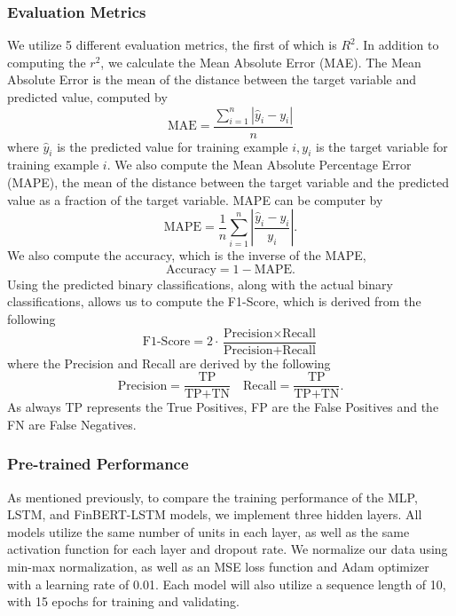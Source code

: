 \documentclass[12pt]{article}
\begin{document}
\subsubsection*{Evaluation Metrics}
We utilize 5 different evaluation metrics, the first of which is $R^2$. In addition to computing the $r^2$, we calculate the Mean Absolute Error (MAE). The Mean Absolute Error is the mean of the distance between the target variable and predicted value, computed by 
\begin{equation}
	\text{MAE}=\frac{\sum_{i=1}^{n}|\hat{y}_i-y_i|}{n}
\end{equation}
where $\hat{y}_i$ is the predicted value for training example $i,y_i$ is the target variable for training example $i$. We also compute the Mean Absolute Percentage Error (MAPE), the mean of the distance between the target variable and the predicted value as a fraction of the target variable. MAPE can be computer by
\begin{equation}
	\text{MAPE}=\frac{1}{n}\sum_{i=1}^{n}\left|\frac{\hat{y}_i-y_i}{y_i}\right|.
\end{equation}
We also compute the accuracy, which is the inverse of the MAPE,
\begin{equation}
	\text{Accuracy}=1-\text{MAPE}.
\end{equation}
Using the predicted binary classifications, along with the actual binary classifications, allows us to compute the F1-Score, which is derived from the following
\begin{equation}
	\text{F1-Score}=2\cdot\frac{\text{Precision}\times\text{Recall}}{\text{Precision}+\text{Recall}}
\end{equation}
where the Precision and Recall are derived by the following
\begin{equation}\label{eq:f1score}
	\text{Precision}=\frac{\text{TP}}{\text{TP}+\text{TN}}\quad\text{Recall}=\frac{\text{TP}}{\text{TP}+\text{TN}}.
\end{equation}
As always TP represents the True Positives, FP are the False Positives and the FN are False Negatives.

\subsubsection*{Pre-trained Performance}

As mentioned previously, to compare the training performance of the MLP, LSTM, and FinBERT-LSTM models, we implement three hidden layers. All models utilize the same number of units in each layer, as well as the same activation function for each layer and dropout rate. We normalize our data using min-max normalization, as well as an MSE loss function and Adam optimizer with a learning rate of 0.01. Each model will also utilize a sequence length of 10, with 15 epochs for training and validating.
\end{document}
